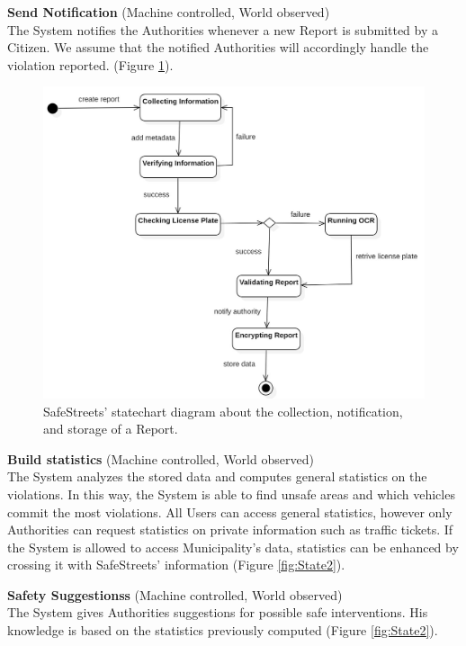 \documentclass{report}
\begin{document}
\noindent\textbf{Send Notification} (Machine controlled, World observed)\\
The System notifies the Authorities whenever a new Report is submitted by a Citizen. 
We assume that the notified Authorities will accordingly handle the violation reported. (Figure \ref{fig:State1}).
\begin{figure}[!ht]
\begin{center}
\includegraphics[width=.8\textwidth]{./img/Statechart_Report.jpg}
\end{center}
\caption{SafeStreets' statechart diagram about the collection, notification, and storage of a Report.}
\label{fig:State1}
\end{figure} 
\newpage
\noindent\textbf{Build statistics} (Machine controlled, World observed)\\
The System analyzes the stored data and computes general statistics on the violations. In this way, the System is able to find unsafe areas and which vehicles commit the most violations. All Users can access general statistics, however only Authorities can request statistics on private information such as traffic tickets. If the System is allowed to access Municipality's data, statistics can be enhanced by crossing it with SafeStreets' information (Figure \ref{fig:State2}).  \\ \vspace{2mm}

\noindent\textbf{Safety Suggestionss} (Machine controlled, World observed)\\
The System gives Authorities suggestions for possible safe interventions. His knowledge is based on the statistics previously computed (Figure \ref{fig:State2}).
\end{document}
